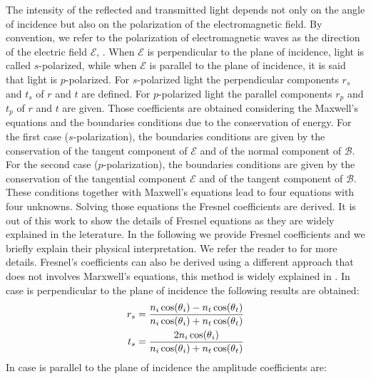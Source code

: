 The intensity of the reflected and transmitted light depends not only on the angle of incidence but also on the polarization of the electromagnetic field.
By convention, we refer to the polarization of electromagnetic waves as the direction of the electric field $\boldsymbol{\mathcal{E}}$, 
\cite{feynman1964feynman}. When $\boldsymbol{\mathcal{E}}$ is perpendicular to the plane of incidence, light is called $s$-polarized, while when
$\boldsymbol{\mathcal{E}}$ is parallel to the plane of incidence, it is said that light is $p$-polarized.
For $s$-polarized light the perpendicular components $r_s$ and $t_s$ of $r$ and $t$ are defined. 
For $p$-polarized light the parallel components $r_p$ and $t_p$ of $r$ and $t$ are given. 
Those coefficients are obtained considering the Maxwell's equations and the boundaries conditions due to the conservation of energy.
For the first case ($s$-polarization), the boundaries conditions are given by the conservation of the tangent component of $\boldsymbol{\mathcal{E}}$ and of the normal component of $\boldsymbol{\mathcal{B}}$. For the second case ($p$-polarization), the boundaries conditions are given by the conservation of the tangential component $\boldsymbol{\mathcal{E}}$ and of the tangent component of $\boldsymbol{\mathcal{B}}$. These conditions together with Maxwell's equations lead to four equations with four unknowns.
Solving those equations the Fresnel coefficients are derived. 
It is out of this work to show the details of Fresnel equations as they are widely explained in the leterature. 
In the following we provide Fresnel coefficients and we briefly explain their physical interpretation. We refer the reader to \cite{born2013principles, hecht1998hecht} for more details. 
Fresnel's coefficients can also be derived using a different approach that does not involves Marxwell's equations, this method is widely explained in \cite{feynman2011feynman}. 
In case  is perpendicular to the plane of incidence the following results are obtained:
\begin{equation} \label{Fresnel_perpendicular}
\begin{split}
r_{s} & = \frac{n_i\cos(\mbox{$\theta$}_i)-n_t \cos(\mbox{$\theta$}_t)}{n_i \cos(\mbox{$\theta$}_i)+n_t\cos(\mbox{$\theta$}_t)}\\
t_{s} & =  \frac{2n_i\cos(\mbox{$\theta$}_i)}{n_i\cos(\mbox{$\theta$}_i)+n_t\cos(\mbox{$\theta$}_t)}
\end{split}
\end{equation}
In case  is parallel to the plane of incidence the amplitude coefficients are:
